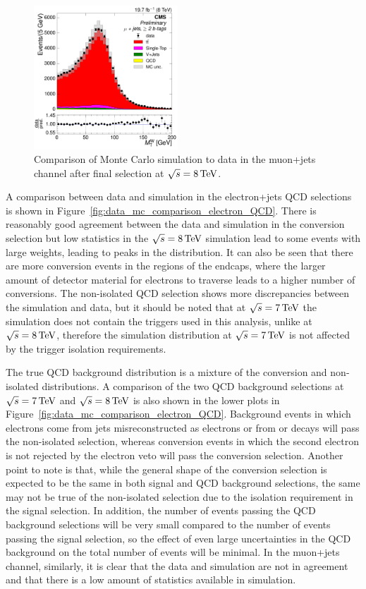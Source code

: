 \begin{figure}[hbtp]
     \includegraphics[width=0.48\textwidth]{Chapters/04_Analysis/04b_XSections/images/control_plots/before_fit/8TeV/MuPlusJets_patType1CorrectedPFMet_MT_2orMoreBtags_with_ratio.pdf}\hfill
     \caption{Comparison of Monte Carlo simulation to data in the muon+jets channel after final
     selection at $\sqrt{s}=8\,\text{Te\hspace{-.08em}V}$.}
     \label{fig:data_mc_comparison_8TeV_muon}
\end{figure}

A comparison between data and simulation in the electron+jets QCD selections is shown in
Figure~\ref{fig:data_mc_comparison_electron_QCD}. There is reasonably good agreement between the data and
simulation in the conversion selection but low statistics in the $\sqrt{s}=8\,\text{Te\hspace{-.08em}V}$ simulation lead to some
events with large weights, leading to peaks in the distribution. It can also be seen that there are more
conversion events in the regions of the endcaps, where the larger amount of detector material for electrons to
traverse leads to a higher number of conversions. The non-isolated QCD selection shows more discrepancies
between the simulation and data, but it should be noted that at $\sqrt{s}=7\,\text{Te\hspace{-.08em}V}$ the simulation does not
contain the triggers used in this analysis, unlike at $\sqrt{s}=8\,\text{Te\hspace{-.08em}V}$, therefore the simulation distribution
at $\sqrt{s}=7\,\text{Te\hspace{-.08em}V}$ is not affected by the trigger isolation requirements.

The true QCD background distribution is a mixture of the conversion and non-isolated distributions. A
comparison of the two QCD background selections at $\sqrt{s}=7\,\text{Te\hspace{-.08em}V}$ and $\sqrt{s}=8\,\text{Te\hspace{-.08em}V}$ is also shown in the
lower plots in Figure~\ref{fig:data_mc_comparison_electron_QCD}. Background events in which electrons come
from jets misreconstructed as electrons or from \bquark or \cquark decays will pass the non-isolated
selection, whereas conversion events in which the second electron is not rejected by the electron veto will
pass the conversion selection. Another point to note is that, while the general shape of the conversion
selection is expected to be the same in both signal and QCD background selections, the same may not be true of
the non-isolated selection due to the isolation requirement in the signal selection. In addition, the number
of events passing the QCD background selections will be very small compared to the number of events passing
the signal selection, so the effect of even large uncertainties in the QCD background on the total number of
events will be minimal. In the muon+jets channel, similarly, it is clear that the data and simulation are not
in agreement and that there is a low amount of statistics available in simulation.

